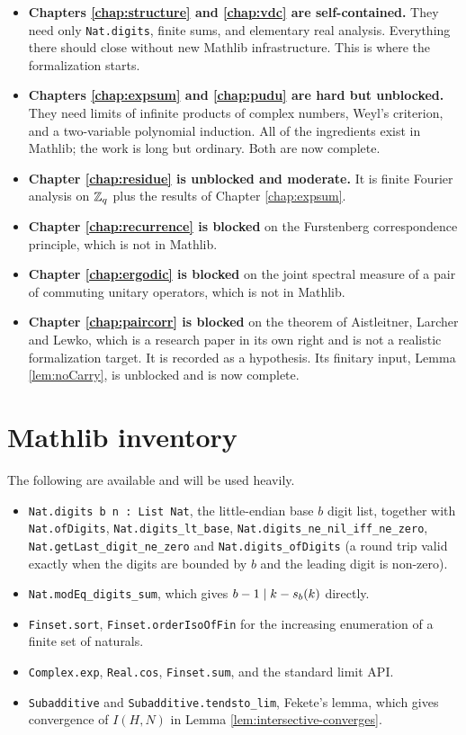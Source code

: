 \begin{itemize}
  \item \textbf{Chapters \ref{chap:structure} and \ref{chap:vdc} are
    self-contained.} They need only \texttt{Nat.digits}, finite sums, and
    elementary real analysis. Everything there should close without new
    Mathlib infrastructure. This is where the formalization starts.
  \item \textbf{Chapters \ref{chap:expsum} and \ref{chap:pudu} are hard but
    unblocked.} They need limits of infinite products of complex numbers,
    Weyl's criterion, and a two-variable polynomial induction. All of the
    ingredients exist in Mathlib; the work is long but ordinary. Both are now
    complete.
  \item \textbf{Chapter \ref{chap:residue} is unblocked and moderate.} It is
    finite Fourier analysis on $\mathbb{Z}_q$ plus the results of Chapter
    \ref{chap:expsum}.
  \item \textbf{Chapter \ref{chap:recurrence} is blocked} on the Furstenberg
    correspondence principle, which is not in Mathlib.
  \item \textbf{Chapter \ref{chap:ergodic} is blocked} on the joint spectral
    measure of a pair of commuting unitary operators, which is not in Mathlib.
  \item \textbf{Chapter \ref{chap:paircorr} is blocked} on the theorem of
    Aistleitner, Larcher and Lewko, which is a research paper in its own right
    and is not a realistic formalization target. It is recorded as a
    hypothesis. Its finitary input, Lemma \ref{lem:noCarry}, is unblocked and
    is now complete.
\end{itemize}

\section{Mathlib inventory}

The following are available and will be used heavily.

\begin{itemize}
  \item \texttt{Nat.digits b n : List Nat}, the little-endian base $b$ digit
    list, together with \texttt{Nat.ofDigits}, \texttt{Nat.digits\_lt\_base},
    \texttt{Nat.digits\_ne\_nil\_iff\_ne\_zero},
    \texttt{Nat.getLast\_digit\_ne\_zero} and
    \texttt{Nat.digits\_ofDigits} (a round trip valid exactly when the digits
    are bounded by $b$ and the leading digit is non-zero).
  \item \texttt{Nat.modEq\_digits\_sum}, which gives $b-1 \mid k - s_b(k)$
    directly.
  \item \texttt{Finset.sort}, \texttt{Finset.orderIsoOfFin} for the increasing
    enumeration of a finite set of naturals.
  \item \texttt{Complex.exp}, \texttt{Real.cos}, \texttt{Finset.sum}, and the
    standard limit API.
  \item \texttt{Subadditive} and \texttt{Subadditive.tendsto\_lim}, Fekete's
    lemma, which gives convergence of $I(H,N)$ in
    Lemma \ref{lem:intersective-converges}.
\end{itemize}

